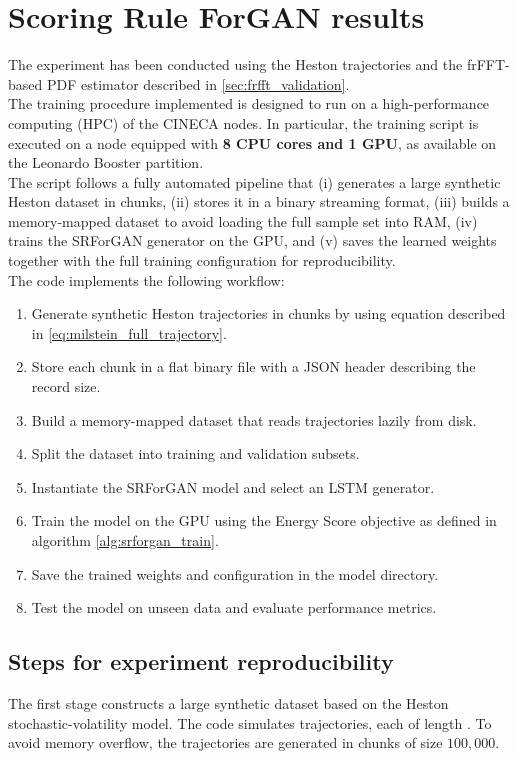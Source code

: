 \section{Scoring Rule ForGAN results}

The experiment has been conducted using the Heston trajectories and the frFFT-based PDF estimator described in \ref{sec:frfft_validation}.\\
The training procedure implemented is designed to run on a high-performance computing (HPC) of the CINECA nodes. In particular, the training script is executed on a node equipped with \textbf{8 CPU cores and 1 GPU}, as available on the Leonardo Booster partition.\\
The script follows a fully automated pipeline that (i) generates a large synthetic Heston dataset in chunks, (ii) stores it in a binary streaming format, (iii) builds a memory-mapped dataset to avoid loading the full sample set into RAM, (iv) trains the SRForGAN generator on the GPU, and (v) saves the learned weights together with the full training configuration for reproducibility.\\

The code implements the following workflow:
\begin{enumerate}
    \item Generate synthetic Heston trajectories in chunks by using equation described in \ref{eq:milstein_full_trajectory}.
    \item Store each chunk in a flat binary file with a JSON header describing the record size.
    \item Build a memory-mapped dataset that reads trajectories lazily from disk.
    \item Split the dataset into training and validation subsets.
    \item Instantiate the SRForGAN model and select an LSTM generator.
    \item Train the model on the GPU using the Energy Score objective as defined in algorithm \ref{alg:srforgan_train}.
    \item Save the trained weights and configuration in the model directory.
    \item Test the model on unseen data and evaluate performance metrics.
\end{enumerate}

\subsection{Steps for experiment reproducibility}
The first stage constructs a large synthetic dataset based on the Heston stochastic-volatility model. 
The code simulates  trajectories, each of length . To avoid memory overflow, the trajectories are generated in chunks of size $100,000$.

